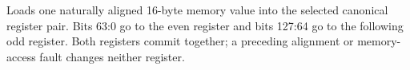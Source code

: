 Loads one naturally aligned 16-byte memory value into the selected canonical register pair. Bits 63:0 go to the
even register and bits 127:64 go to the following odd register. Both registers commit together; a preceding
alignment or memory-access fault changes neither register.
